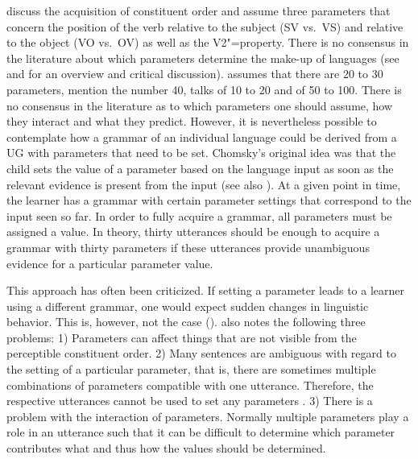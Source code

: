 \largerpage[2]
\citet{GW94a} discuss the acquisition of constituent order and assume three parameters that concern the
position of the verb relative to the subject (SV vs.\ VS) and relative to the
object (VO vs.\ OV) as well as the V2"=property. There is no consensus in the literature about which
parameters determine the make-up of languages (see \citealp[Section~3.2]{Newmeyer2005a} and \citealp{Haspelmath2008a}
for an overview and critical discussion).
\citet[--347]{Fodor98a} assumes that there are 20 to 30 parameters, \citet[]{GW94a}
mention the number 40, \citet[]{Baker2003b} talks of 10 to 20 and \citet[]{RH2005a}
of 50 to 100. There is no consensus in the literature as to which parameters one should assume, how they interact
and what they predict. However, it is nevertheless possible to contemplate how a grammar of an individual language
could be derived from a UG with parameters that need to be set.
Chomsky's original idea \citeyearpar[Section~3.5.1]{Chomsky86a} was that the child sets the value of
a parameter based on the language input as soon as the relevant evidence is present from the input
(see also \citealp*{GW94a,NKN2001a}). At a given point in time, the learner has a grammar with certain parameter
 settings that correspond to the input seen so far. In order to fully acquire a grammar, all parameters must be assigned a value. In theory,
 thirty utterances should be enough to acquire a grammar with thirty parameters if these utterances
 provide unambiguous evidence for a particular parameter value.

This approach has often been criticized. If setting a parameter leads to a learner using a
different grammar, one would expect sudden changes in linguistic behavior. This is, however,
not the case (\citealp[]{Bloom93a}). \citet[--344]{Fodor98a} also notes
the following three problems: 1) Parameters can affect things that are not visible from the
perceptible constituent order. 2) Many sentences are ambiguous with regard to the setting of a particular
parameter, that is, there are sometimes multiple combinations of parameters compatible with one
utterance. Therefore, the respective utterances cannot be used to set any parameters \citep{BN96a,Fodor98b}. 3) There is a problem with the interaction of parameters.
Normally multiple parameters play a role in an utterance such that it can be difficult to determine
which parameter contributes what and thus how the values should be determined.\nocite{Pullum83a}

